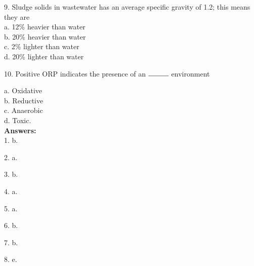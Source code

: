 \vspace{0.5cm}

9. Sludge solids in wastewater has an average specific gravity of 1.2; this means they are\\

a. 12\% heavier than water \\
b. 20\% heavier than water \\
c. 2\% lighter than water \\
d. 20\% lighter than water \\

\vspace{0.5cm}

10. Positive ORP indicates the presence of an $\rule{1cm}{0.15mm}$ environment

a. Oxidative \\
b. Reductive \\
c. Anaerobic \\
d. Toxic. \\
\vspace{2cm}
\textbf{Answers:}\\
1.	b. \\ 

\vspace{0.5cm}

2.	a. \\ 

\vspace{0.5cm}

3.	b.  \\
\vspace{0.5cm}


4.	a.  \\
\vspace{0.5cm}


5.	a.  \\
\vspace{0.5cm}


6.	b.  \\
\vspace{0.5cm}


7.	b.  \\

\vspace{0.5cm}

8.	e.  \\








					      
					      
